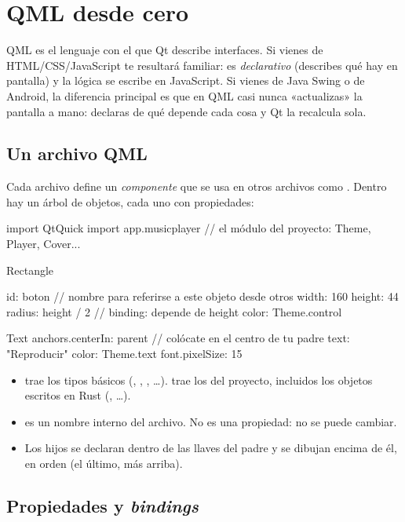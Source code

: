 \chapter{QML desde cero}
\label{cap:qml}

QML es el lenguaje con el que Qt describe interfaces. Si vienes de HTML/CSS/JavaScript te
resultará familiar: es \emph{declarativo} (describes qué hay en pantalla) y la lógica se
escribe en JavaScript. Si vienes de Java Swing o de Android, la diferencia principal es que en
QML casi nunca «actualizas» la pantalla a mano: declaras de qué depende cada cosa y Qt la
recalcula sola.

\section{Un archivo QML}

Cada archivo  define un \emph{componente} que se usa en otros archivos
como . Dentro hay un árbol de objetos, cada uno con propiedades:

\begin{qml}
import QtQuick
import app.musicplayer        // el módulo del proyecto: Theme, Player, Cover...

Rectangle {
    id: boton                 // nombre para referirse a este objeto desde otros
    width: 160
    height: 44
    radius: height / 2        // binding: depende de height
    color: Theme.control

    Text {
        anchors.centerIn: parent         // colócate en el centro de tu padre
        text: "Reproducir"
        color: Theme.text
        font.pixelSize: 15
    }
}
\end{qml}

\begin{itemize}
  \item {} trae los tipos básicos (, ,
  , …).  trae los del proyecto, incluidos los
  objetos escritos en Rust (, …).
  \item {} es un nombre interno del archivo. No es una propiedad: no se puede cambiar.
  \item Los hijos se declaran dentro de las llaves del padre y se dibujan encima de él, en
  orden (el último, más arriba).
\end{itemize}

\section{Propiedades y \emph{bindings}}

